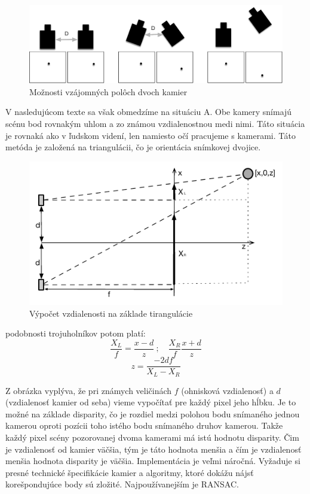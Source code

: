 \begin{figure}[H]
\begin{center}
	\includegraphics[scale=0.5]{obrazky/poloha_kamier_3D}
	\caption{Možnosti vzájomných polôch dvoch kamier}
	\end{center}
\end{figure}


V nasledujúcom texte sa však obmedzíme na situáciu A. Obe kamery snímajú scénu bod rovnakým uhlom a zo známou vzdialenostnou medi nimi. Táto situácia je rovnaká ako v ľudskom videní, len namiesto očí pracujeme s kamerami. Táto metóda je založená na triangulácii, čo je orientácia snímkovej dvojice. 

\begin{figure}[H]
\begin{center}
	\includegraphics[scale=1.8]{obrazky/triangulacia}
	\caption{Výpočet vzdialenosti na základe tirangulácie}
	\end{center}
\end{figure}

podobnosti trojuholníkov potom platí:
$$\frac{X_L}{f}=\frac{x-d}{z}\ {;}\quad \frac{X_R}{f}\frac{x+d}{z}$$ 
$$ z=\frac{-2df}{X_L-X_R}$$

Z obrázka vyplýva, že pri známych veličinách $f$ (ohnisková vzdialenosť) a $d$ (vzdialenosť kamier od seba) vieme vypočítať pre každý pixel jeho hĺbku. Je to možné na základe disparity, čo je rozdiel medzi polohou bodu snímaného jednou kamerou oproti pozícii toho istého bodu snímaného druhov kamerou. Takže každý pixel scény pozorovanej dvoma kamerami má istú hodnotu disparity. Čim je vzdialenosť od kamier väčšia, tým je táto hodnota menšia a čím je vzdialenosť menšia hodnota disparity je väčšia. Implementácia je veľmi náročná. Vyžaduje si presné technické špecifikácie kamier a algoritmy, ktoré dokážu nájsť korešpondujúce body sú zložité. Najpoužívanejším je RANSAC. 


